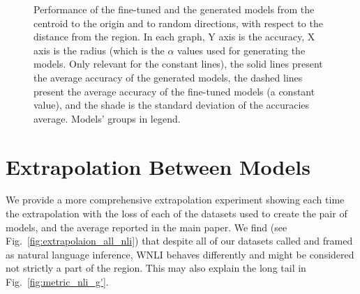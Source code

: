 \documentclass[nohyperref]{article}
\theoremstyle{plain}
\theoremstyle{definition}
\theoremstyle{remark}
\begin{document}
\begin{figure*}[t]
\caption{Performance of the fine-tuned and the generated models from the centroid to the origin and to random directions, with respect to the distance from the region. In each graph, Y axis is the accuracy, X axis is the radius (which is the $ \alpha $ values used for generating the models. Only relevant for the constant lines), the solid lines present the average accuracy of the generated models, the dashed lines present the average accuracy of the fine-tuned models (a constant value), and the shade is the standard deviation of the accuracies average. Models' groups in legend.}  
\label{fig:random_directions}
\end{figure*}


\section{Extrapolation Between Models}\label{ap:sec:extrapolations}
We provide a more comprehensive extrapolation experiment showing each time the extrapolation with the loss of each of the datasets used to create the pair of models, and the average reported in the main paper. We find (see Fig.~\ref{fig:extrapolaion_all_nli}) that despite all of our datasets called and framed as natural language inference, WNLI \citep{Levesque2011TheWS} behaves differently and might be considered not strictly a part of the region. This may also explain the long tail in Fig.~\ref{fig:metric_nli_g'}.
\end{document}
